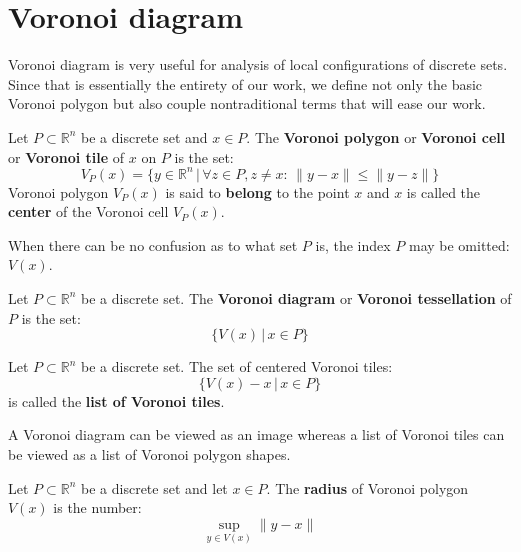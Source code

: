 \documentclass[text.tex]{subfiles}
\begin{document}
\section{Voronoi diagram}\label{sec_voronoi} %
Voronoi diagram is very useful for analysis of local configurations of discrete sets. Since that is essentially the entirety of our work, we define not only the basic Voronoi polygon but also couple nontraditional terms that will ease our work. 

\begin{definition}
Let $P\subset \mathbb{R}^n$ be a discrete set and $x\in P$. The \textbf{Voronoi polygon} or \textbf{Voronoi cell} or \textbf{Voronoi tile} of $x$ on $P$ is the set: 
$$V_P(x) = \{ y \in \mathbb{R}^n \,|\, \forall z \in P, z\neq x:\, \|y-x\|\leq\|y-z\| \}$$
Voronoi polygon $V_P(x)$ is said to \textbf{belong} to the point $x$ and $x$ is called the \textbf{center} of the Voronoi cell $V_P(x)$. 
\end{definition}

\begin{remark}
When there can be no confusion as to what set $P$ is, the index $P$ may be omitted: $V(x)$.
\end{remark}

\begin{definition}
Let $P\subset \mathbb{R}^n$ be a discrete set. The \textbf{Voronoi diagram} or \textbf{Voronoi tessellation} of $P$ is the set: 
$$\{V(x)\,|\, x\in P\}$$
\end{definition}

\begin{definition}
Let $P\subset \mathbb{R}^n$ be a discrete set. The set of centered Voronoi tiles: 
$$\{V(x)-x\,|\, x\in P\}$$
is called the \textbf{list of Voronoi tiles}.
\end{definition}

\begin{remark}
A Voronoi diagram can be viewed as an image whereas a list of Voronoi tiles can be viewed as a list of Voronoi polygon shapes. 
\end{remark}

\begin{definition}
Let $P\subset \mathbb{R}^n$ be a discrete set and let $x\in P$. The \textbf{radius} of Voronoi polygon $V(x)$ is the number: 
$$\sup_{y\in V(x)}\lVert y-x\rVert$$
\end{definition}
\end{document}
